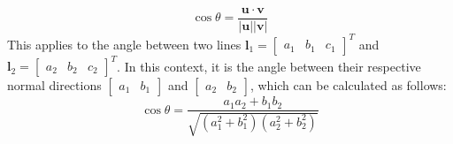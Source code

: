 \[\cos\theta=\dfrac{\mathbf{u} \cdot \mathbf{v}}{\left\lvert \mathbf{u} \right\rvert \left\lvert \mathbf{v} \right\rvert}\] 
This applies to the angle between two lines $\mathbf{l}_1={\begin{bmatrix} a_1 & b_1 & c_1 \end{bmatrix}}^T$ and $\mathbf{l}_2={\begin{bmatrix} a_2 & b_2 & c_2 \end{bmatrix}}^T$. 
In this context, it is the angle between their respective normal directions $\begin{bmatrix} a_1 & b_1 \end{bmatrix}$ and $\begin{bmatrix} a_2 & b_2 \end{bmatrix}$, which can be calculated as follows:
\[\cos\theta=\dfrac{a_1a_2+b_1b_2}{\sqrt{\left( a_1^2 + b_1^2 \right)\left( a_2^2 + b_2^2 \right)}}\]

